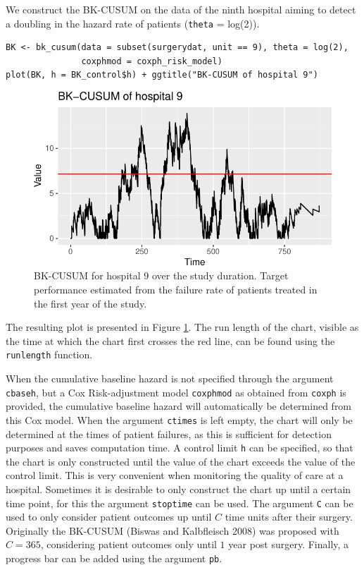 We construct the BK-CUSUM on the data of the ninth hospital aiming to detect a doubling in the hazard rate of patients (\texttt{theta} = log(2)).

\begin{verbatim}
BK <- bk_cusum(data = subset(surgerydat, unit == 9), theta = log(2),
               coxphmod = coxph_risk_model)
plot(BK, h = BK_control$h) + ggtitle("BK-CUSUM of hospital 9")
\end{verbatim}

\begin{figure}
\centering
\includegraphics{RJ-2023-095_files/figure-latex/bkcusum9-1.pdf}
\caption{\label{fig:bkcusum9}BK-CUSUM for hospital 9 over the study duration. Target performance estimated from the failure rate of patients treated in the first year of the study.}
\end{figure}

The resulting plot is presented in Figure \ref{fig:bkcusum9}. The run length of the chart, visible as the time at which the chart first crosses the red line, can be found using the \texttt{runlength} function.

When the cumulative baseline hazard is not specified through the argument \texttt{cbaseh}, but a Cox Risk-adjustment model \texttt{coxphmod} as obtained from \texttt{coxph} is provided, the cumulative baseline hazard will automatically be determined from this Cox model. When the argument \texttt{ctimes} is left empty, the chart will only be determined at the times of patient failures, as this is sufficient for detection purposes and saves computation time. A control limit \texttt{h} can be specified, so that the chart is only constructed until the value of the chart exceeds the value of the control limit. This is very convenient when monitoring the quality of care at a hospital. Sometimes it is desirable to only construct the chart up until a certain time point, for this the argument \texttt{stoptime} can be used. The argument \texttt{C} can be used to only consider patient outcomes up until \(C\) time units after their surgery. Originally the BK-CUSUM (Biswas and Kalbfleisch 2008) was proposed with \(C = 365\), considering patient outcomes only until \(1\) year post surgery. Finally, a progress bar can be added using the argument \texttt{pb}.

